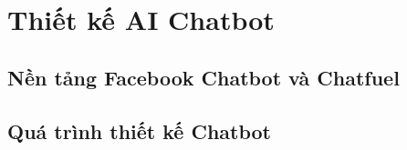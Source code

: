\chapter{Thiết kế AI Chatbot}

\section{Nền tảng Facebook Chatbot và Chatfuel}

\section{Quá trình thiết kế Chatbot}
